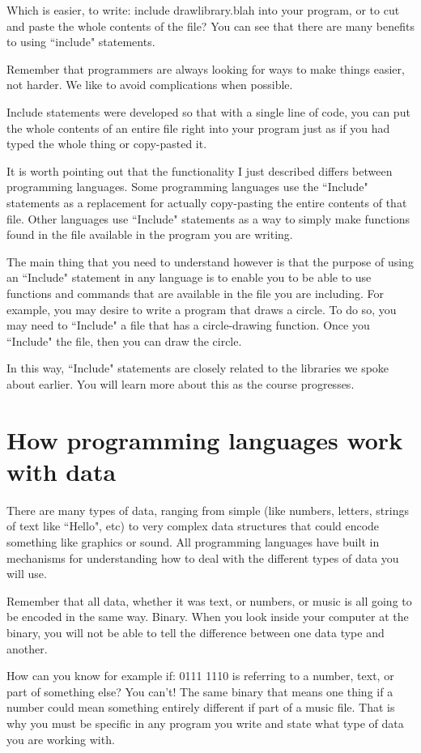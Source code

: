 \documentclass[a4paper,12pt]{article}
\let\stdsection\section
\renewcommand\section{\newpage\stdsection}
\begin{document}
Which is easier, to write: include drawlibrary.blah into your program, or to cut and paste the whole contents of the file? You can see that there are many benefits to using ``include" statements.

Remember that programmers are always looking for ways to make things easier, not harder. We like to avoid complications when possible.

Include statements were developed so that with a single line of code, you can put the whole contents of an entire file right into your program just as if you had typed the whole thing or copy-pasted it.

It is worth pointing out that the functionality I just described differs between programming languages. Some programming languages use the ``Include" statements as a replacement for actually copy-pasting the entire contents of that file. Other languages use ``Include" statements as a way to simply make functions found in the file available in the program you are writing.

The main thing that you need to understand however is that the purpose of using an ``Include" statement in any language is to enable you to be able to use functions and commands that are available in the file you are including. For example, you may desire to write a program that draws a circle. To do so, you may need to ``Include" a file that has a circle-drawing function. Once you ``Include" the file, then you can draw the circle.

In this way, ``Include" statements are closely related to the libraries we spoke about earlier. You will learn more about this as the course progresses.
\section{How programming languages work with data}
There are many types of data, ranging from simple (like numbers, letters, strings of text like ``Hello", etc) to very complex data structures that could encode something like graphics or sound. All programming languages have built in mechanisms for understanding how to deal with the different types of data you will use.

Remember that all data, whether it was text, or numbers, or music is all going to be encoded in the same way. Binary. When you look inside your computer at the binary, you will not be able to tell the difference between one data type and another.

How can you know for example if: 0111 1110 is referring to a number, text, or part of something else? You can't! The same binary that means one thing if a number could mean something entirely different if part of a music file. That is why you must be specific in any program you write and state what type of data you are working with.
\end{document}
